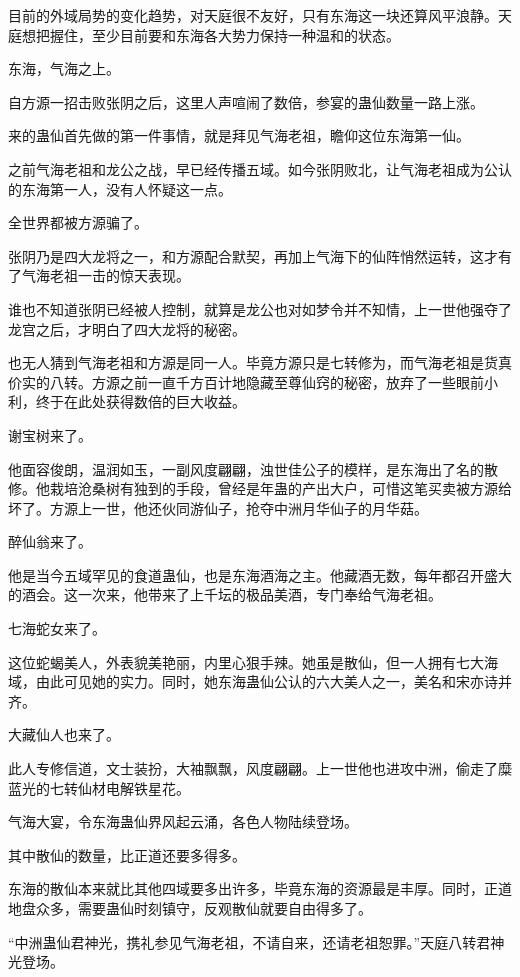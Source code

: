 \begin{this_body}
目前的外域局势的变化趋势，对天庭很不友好，只有东海这一块还算风平浪静。天庭想把握住，至少目前要和东海各大势力保持一种温和的状态。

东海，气海之上。

自方源一招击败张阴之后，这里人声喧闹了数倍，参宴的蛊仙数量一路上涨。

来的蛊仙首先做的第一件事情，就是拜见气海老祖，瞻仰这位东海第一仙。

之前气海老祖和龙公之战，早已经传播五域。如今张阴败北，让气海老祖成为公认的东海第一人，没有人怀疑这一点。

全世界都被方源骗了。

张阴乃是四大龙将之一，和方源配合默契，再加上气海下的仙阵悄然运转，这才有了气海老祖一击的惊天表现。

谁也不知道张阴已经被人控制，就算是龙公也对如梦令并不知情，上一世他强夺了龙宫之后，才明白了四大龙将的秘密。

也无人猜到气海老祖和方源是同一人。毕竟方源只是七转修为，而气海老祖是货真价实的八转。方源之前一直千方百计地隐藏至尊仙窍的秘密，放弃了一些眼前小利，终于在此处获得数倍的巨大收益。

谢宝树来了。

他面容俊朗，温润如玉，一副风度翩翩，浊世佳公子的模样，是东海出了名的散修。他栽培沧桑树有独到的手段，曾经是年蛊的产出大户，可惜这笔买卖被方源给坏了。方源上一世，他还伙同游仙子，抢夺中洲月华仙子的月华菇。

醉仙翁来了。

他是当今五域罕见的食道蛊仙，也是东海酒海之主。他藏酒无数，每年都召开盛大的酒会。这一次来，他带来了上千坛的极品美酒，专门奉给气海老祖。

七海蛇女来了。

这位蛇蝎美人，外表貌美艳丽，内里心狠手辣。她虽是散仙，但一人拥有七大海域，由此可见她的实力。同时，她东海蛊仙公认的六大美人之一，美名和宋亦诗并齐。

大藏仙人也来了。

此人专修信道，文士装扮，大袖飘飘，风度翩翩。上一世他也进攻中洲，偷走了糜蓝光的七转仙材电解铁星花。

气海大宴，令东海蛊仙界风起云涌，各色人物陆续登场。

其中散仙的数量，比正道还要多得多。

东海的散仙本来就比其他四域要多出许多，毕竟东海的资源最是丰厚。同时，正道地盘众多，需要蛊仙时刻镇守，反观散仙就要自由得多了。

“中洲蛊仙君神光，携礼参见气海老祖，不请自来，还请老祖恕罪。”天庭八转君神光登场。


\end{this_body}
